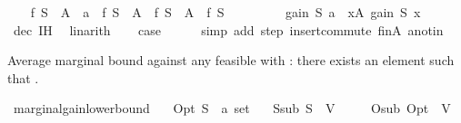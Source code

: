 \begin{isabellebody}
\isanewline
\isanewline
\ \ \isamarkupfalse%
\ {\isachardoublequoteopen}{\isacharparenleft}{\kern0pt}f\ {\isacharparenleft}{\kern0pt}{\isacharparenleft}{\kern0pt}S\ {\isasymunion}\ A{\isacharparenright}{\kern0pt}\ {\isasymunion}\ {\isacharbraceleft}{\kern0pt}a{\isacharbraceright}{\kern0pt}{\isacharparenright}{\kern0pt}\ {\isacharminus}{\kern0pt}\ f\ {\isacharparenleft}{\kern0pt}S\ {\isasymunion}\ A{\isacharparenright}{\kern0pt}{\isacharparenright}{\kern0pt}\ {\isacharplus}{\kern0pt}\ {\isacharparenleft}{\kern0pt}f\ {\isacharparenleft}{\kern0pt}S\ {\isasymunion}\ A{\isacharparenright}{\kern0pt}\ {\isacharminus}{\kern0pt}\ f\ S{\isacharparenright}{\kern0pt}\isanewline
\ \ \ \ \ \ \ \ {\isasymle}\ gain\ S\ a\ {\isacharplus}{\kern0pt}\ {\isacharparenleft}{\kern0pt}{\isasymSum}x{\isasymin}A{\isachardot}{\kern0pt}\ gain\ S\ x{\isacharparenright}{\kern0pt}{\isachardoublequoteclose}\isanewline
\ \ \ \ \isamarkupfalse%
\ dec\ IH\ \isamarkupfalse%
\ linarith\isanewline
\ \ \isamarkupfalse%
\ {\isacharquery}{\kern0pt}case\isanewline
\ \ \ \ \isamarkupfalse%
\ {\isacharparenleft}{\kern0pt}simp\ add{\isacharcolon}{\kern0pt}\ step\ insert{\isacharunderscore}{\kern0pt}commute\ finA\ a{\isacharunderscore}{\kern0pt}notin{\isacharparenright}{\kern0pt}\isanewline
{}\isamarkupfalse%
%
\endisatagproof
{\isafoldproof}%
%
\isadelimproof
%
\endisadelimproof
%
\begin{isamarkuptext}%
Average marginal bound against any feasible  with :
  there exists an element  such that
  .%
\end{isamarkuptext}\isamarkuptrue%
\isamarkupfalse%
\ marginal{\isacharunderscore}{\kern0pt}gain{\isacharunderscore}{\kern0pt}lower{\isacharunderscore}{\kern0pt}bound{\isacharcolon}{\kern0pt}\isanewline
\ \ \ Opt\ S\ {\isacharcolon}{\kern0pt}{\isacharcolon}{\kern0pt}\ {\isachardoublequoteopen}{\isacharprime}{\kern0pt}a\ set{\isachardoublequoteclose}\isanewline
\ \ \ S{\isacharunderscore}{\kern0pt}sub{\isacharcolon}{\kern0pt}\ {\isachardoublequoteopen}S\ {\isasymsubseteq}\ V{\isachardoublequoteclose}\isanewline
\ \ \ \ \ O{\isacharunderscore}{\kern0pt}sub{\isacharcolon}{\kern0pt}\ {\isachardoublequoteopen}Opt\ {\isasymsubseteq}\ V{\isachardoublequoteclose}\isanewline

\end{isabellebody}

